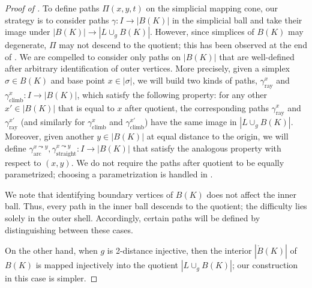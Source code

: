 \documentclass[a4paper,english,cleveref,autoref,thm-restate,nolineno]{socg-lipics-v2021}
\newcommand{\geomreal}[1] { |#1| } %
\begin{document}
\begin{proof}[Proof of ]
	
	To define paths $\Pi(x,y,t)$ on the simplicial mapping cone, our strategy is to consider paths $\gamma \colon I\to \geomreal{B(K)}$ in the simplicial ball and take their image under $\geomreal{B(K)}\to \geomreal{L\cup_g B(K)}$.
	However, since simplices of $B(K)$ may degenerate, $\Pi$ may not descend to the quotient; this has been observed at the end of .	
	We are compelled to consider only paths on $\geomreal{B(K)}$ that are well-defined after arbitrary identification of outer vertices.
	More precisely, given a simplex $\sigma\in B(K)$ and base point $x\in\geomreal{\sigma}$, we will build two kinds of paths, $\gamma^x_\mathrm{ray}$ and $\gamma^x_\mathrm{climb}\colon I\to \geomreal{B(K)}$, which satisfy the following property: for any other $x'\in\geomreal{B(K)}$ that is equal to $x$ after quotient, the corresponding paths $\gamma_\mathrm{ray}^x$ and $\gamma_\mathrm{ray}^{x'}$ (and similarly for $\gamma^x_\mathrm{climb}$ and $\gamma^{x'}_\mathrm{climb}$) have the same image in $\geomreal{L\cup_g B(K)}$.
	Moreover, given another $y\in\geomreal{B(K)}$ at equal distance to the origin, we will define $\gamma^{x\leadsto y}_\mathrm{arc},\gamma^{x\leadsto y}_\mathrm{straight}\colon I\to \geomreal{B(K)}$ that satisfy the analogous property with respect to $(x,y)$.
	We do not require the paths after quotient to be equally parametrized; choosing a parametrization is handled in .
	
	We note that identifying boundary vertices of $B(K)$ does not affect the inner ball.
	Thus, every path in the inner ball descends to the quotient;
	the difficulty lies solely in the outer shell.
	Accordingly, certain paths will be defined by distinguishing between these cases.
	
	On the other hand, when $g$ is 2-distance injective, then the interior $\geomreal{\mathring{B}(K)}$ of $B(K)$ is mapped injectively into the quotient $\geomreal{L\cup_g B(K)}$; our construction in this case is simpler.


\end{proof}
\end{document}
